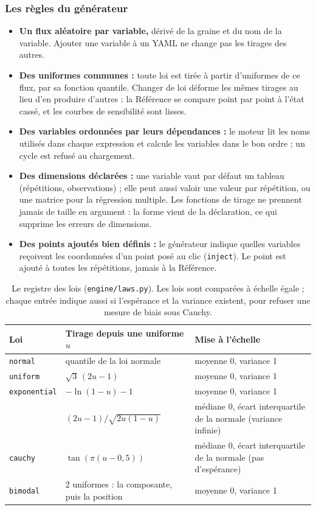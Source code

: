 \documentclass[11pt,a4paper]{article}
\begin{document}
\subsubsection{Les règles du générateur}
\begin{itemize}[leftmargin=*, nosep]
  \item \textbf{Un flux aléatoire par variable,} dérivé de la graine et du nom de la variable. Ajouter une variable à un YAML ne change pas les tirages des autres.
  \item \textbf{Des uniformes communes :} toute loi est tirée à partir d'uniformes de ce flux, par sa fonction quantile. Changer de loi déforme les mêmes tirages au lieu d'en produire d'autres : la Référence se compare point par point à l'état cassé, et les courbes de sensibilité sont lisses.
  \item \textbf{Des variables ordonnées par leurs dépendances :} le moteur lit les noms utilisés dans chaque expression et calcule les variables dans le bon ordre ; un cycle est refusé au chargement.
  \item \textbf{Des dimensions déclarées :} une variable vaut par défaut un tableau (répétitions, observations) ; elle peut aussi valoir une valeur par répétition, ou une matrice pour la régression multiple. Les fonctions de tirage ne prennent jamais de taille en argument : la forme vient de la déclaration, ce qui supprime les erreurs de dimensions.
  \item \textbf{Des points ajoutés bien définis :} le générateur indique quelles variables reçoivent les coordonnées d'un point posé au clic (\texttt{inject}). Le point est ajouté à toutes les répétitions, jamais à la Référence.
\end{itemize}

\begin{table}[H]
  \centering
  \small
  \begin{tabularx}{\textwidth}{@{}L{2.6cm} L{5.2cm} Y@{}}
    \toprule
    \textbf{Loi} & \textbf{Tirage depuis une uniforme $u$} & \textbf{Mise à l'échelle} \\
    \midrule
    \texttt{normal} & quantile de la loi normale & moyenne 0, variance 1 \\
    \texttt{uniform} & $\sqrt{3}\,(2u - 1)$ & moyenne 0, variance 1 \\
    \texttt{exponential} & $-\ln(1 - u) - 1$ & moyenne 0, variance 1 \\
     & $(2u - 1)/\sqrt{2u(1-u)}$ & médiane 0, écart interquartile de la normale (variance infinie) \\
    \texttt{cauchy} & $\tan(\pi(u - 0{,}5))$ & médiane 0, écart interquartile de la normale (pas d'espérance) \\
    \texttt{bimodal} & 2 uniformes : la composante, puis la position & moyenne 0, variance 1 \\
    \bottomrule
  \end{tabularx}
  \caption{Le registre des lois (\texttt{engine/laws.py}). Les lois sont comparées à échelle égale ; chaque entrée indique aussi si l'espérance et la variance existent, pour refuser une mesure de biais sous Cauchy.}
\end{table}
\end{document}
